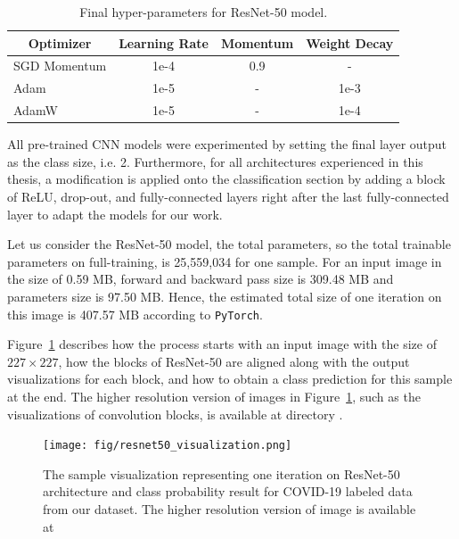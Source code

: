 \begin{table}[h]
	\centering
	\caption{Final hyper-parameters for ResNet-50 model.}
	\label{tab:cnn_hyperparameters}
	\begin{tabular}{lccc}
		\hline 
		\multicolumn{1}{c}{\textbf{Optimizer}} & \textbf{Learning Rate} & \textbf{Momentum} & \textbf{Weight Decay} \\ \hline \hline
		SGD Momentum                           & 1e-4                   & 0.9               & -                     \\ 
		Adam                                   & 1e-5                   & -                 & 1e-3                     \\ 
		AdamW                                  & 1e-5                   & -                 & 1e-4   \\  \hline              
	\end{tabular}
\end{table}

All pre-trained CNN models were experimented by setting the final layer output as the class size, i.e. 2. Furthermore, for all architectures experienced in this thesis,  a modification is applied onto the classification section by adding a block of ReLU, drop-out, and fully-connected layers right after the last fully-connected layer to adapt the models for our work.

Let us consider the ResNet-50 model, the total parameters, so the total trainable parameters on full-training, is 25,559,034 for one sample. For an input image in the size of 0.59 MB, forward and backward pass size is 309.48 MB and parameters size is 97.50 MB. Hence, the estimated total size of one iteration on this image is 407.57 MB according to \verb|PyTorch|.

Figure~\ref{fig:resnet50_visualization} describes how the process starts with an input image with the size of $227 \times 227$, how the blocks of ResNet-50 are aligned along with the output visualizations for each block, and how to obtain a class prediction for this sample at the end. The higher resolution version of images in Figure~\ref{fig:resnet50_visualization}, such as the visualizations of convolution blocks, is available at directory \textcolor{blue}{}.


\begin{landscape}
	\begin{figure}[h]
		\centering
		\texttt{[image: fig/resnet50\_visualization.png]}
		\vspace{1mm}
		\caption{The sample visualization representing one iteration on ResNet-50 architecture and class probability result for COVID-19 labeled data from our dataset. The higher resolution version of image is available at \\  \textcolor{blue}{}}
		\label{fig:resnet50_visualization}
	\end{figure}
\end{landscape}


